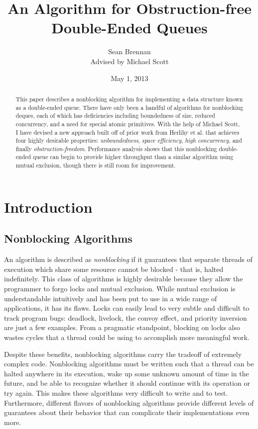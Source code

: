 \documentclass[11pt, letterpaper]{article}
\title{An Algorithm for Obstruction-free Double-Ended Queues}
\author{Sean Brennan \\ Advised by Michael Scott}
\date{May 1, 2013}
\begin{document}
    \maketitle

    \begin{abstract}
        This paper describes a nonblocking algorithm for implementing a data structure known as a double-ended queue. There have only been a handful of algorithms for nonblocking deques, each of which has deficiencies including boundedness of size, reduced concurrency, and a need for special atomic primitives. With the help of Michael Scott, I have devised a new approach built off of prior work from Herlihy et al. that achieves four highly desirable properties: \emph{unboundedness}, \emph{space efficiency}, \emph{high concurrency}, and finally \emph{obstruction-freedom}. Performance analysis shows that this nonblocking double-ended queue can begin to provide higher throughput than a similar algorithm using mutual exclusion, though there is still room for improvement.
    \end{abstract}

    \section{Introduction}
        \subsection{Nonblocking Algorithms}
            An algorithm is described as \emph{nonblocking} if it guarantees that separate threads of execution which share some resource cannot be blocked - that is, halted indefinitely. This class of algorithms is highly desirable because they allow the programmer to forgo locks and mutual exclusion. While mutual exclusion is understandable intuitively and has been put to use in a wide range of applications, it has its flaws. Locks can easily lead to very subtle and difficult to track program bugs: deadlock, livelock, the convoy effect, and priority inversion are just a few examples. From a pragmatic standpoint, blocking on locks also wastes cycles that a thread could be using to accomplish more meaningful work.

            Despite these benefits, nonblocking algorithms carry the tradeoff of extremely complex code. Nonblocking algorithms must be written such that a thread can be halted anywhere in its execution, wake up some unknown amount of time in the future, and be able to recognize whether it should continue with its operation or try again. This makes these algorithms very difficult to write and to test. Furthermore, different flavors of nonblocking algorithms provide different levels of guarantees about their behavior that can complicate their implementations even more.
\end{document}
